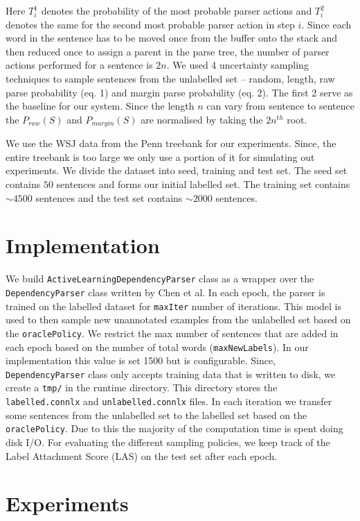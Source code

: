 \documentclass[11pt,letterpaper]{article}
\newcommand{\code}[1]{\small \texttt{#1}}
\begin{document}
Here $T_i^1$ denotes the probability of the most probable parser actions and $T_i^2$ denotes the same for the second most probable parser action in step $i$. Since each word in the sentence has to be moved once from the buffer onto the stack and then reduced once to assign a parent in the parse tree, the number of parser actions performed for a sentence is $2n$. We used 4 uncertainty sampling techniques to sample sentences from the unlabelled set -- random, length, raw parse probability (eq. 1) and margin parse probability (eq. 2). The first 2 serve as the baseline for our system. Since the length $n$ can vary from sentence to sentence the $P_{raw}(S)$ and $P_{margin}(S)$ are normalised by taking the $2n^{th}$ root.

We use the WSJ data from the Penn treebank for our experiments. Since, the entire treebank is too large we only use a portion of it for simulating out experiments. We divide the dataset into seed, training and test set. The seed set contains $50$ sentences and forms our initial labelled set. The training set contains $\sim4500$ sentences and the test set contains $\sim2000$ sentences.

\section{Implementation}
 
 We build \code{ActiveLearningDependencyParser} class as a wrapper over the \code{DependencyParser} class written by Chen et al. In each epoch, the parser is trained on the labelled dataset for \code{maxIter} number of iterations. This model is used to then sample new unannotated examples from the unlabelled set based on the \code{oraclePolicy}. We restrict the max number of sentences that are added in each epoch based on the number of total words (\code{maxNewLabels}). In our implementation this value is set 1500 but is configurable. Since, \code{DependencyParser} class only accepts training data that is written to disk, we create a \code{tmp/} in the runtime directory. This directory stores the \code{labelled.connlx} and \code{unlabelled.connlx} files. In each iteration we transfer some sentences from the unlabelled set to the labelled set based on the \code{oraclePolicy}. Due to this the majority of the computation time is spent doing disk I/O. For evaluating the different sampling policies, we keep track of the Label Attachment Score (LAS) on the test set after each epoch.
 
 \section{Experiments}
 
\end{document}
